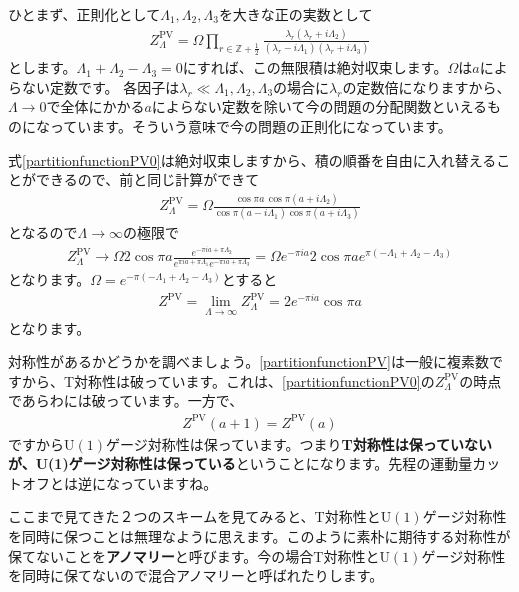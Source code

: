 \documentclass[paper=a4, fontsize=12pt, line_length=16cm, number_of_lines=33,dvipdfmx]{jlreq}
\numberwithin{equation}{section}
\newcommand{\Zb}{\mathbb{Z}}
\newcommand{\strong}[1]{\textsf{\bfseries #1}}
\newcommand{\halfint}{\Zb+\frac{1}{2}}
\newcommand{\U}{\mathrm{U}}
\newcommand{\ZPV}{Z^{\mathrm{PV}}}
\begin{document}
ひとまず、正則化として$\Lambda_1,\Lambda_2,\Lambda_3$を大きな正の実数として
\begin{align}
  \ZPV_{\Lambda}=\Omega \prod_{r\in \halfint}\frac{\lambda_r(\lambda_r+i\Lambda_2)}{(\lambda_r-i\Lambda_1)(\lambda_r+i\Lambda_3)}\label{partitionfunctionPV0}
\end{align}
とします。$\Lambda_1+\Lambda_2-\Lambda_3=0$にすれば、この無限積は絶対収束します。$\Omega$は$a$によらない定数です。
各因子は$\lambda_r\ll \Lambda_1,\Lambda_2,\Lambda_3$の場合に$\lambda_r$の定数倍になりますから、$\Lambda\to 0$で全体にかかる$a$によらない定数を除いて今の問題の分配関数といえるものになっています。そういう意味で今の問題の正則化になっています。

式\eqref{partitionfunctionPV0}は絶対収束しますから、積の順番を自由に入れ替えることができるので、前と同じ計算ができて
\begin{align}
  \ZPV_{\Lambda}=\Omega \frac{\cos\pi a\, \cos \pi(a+i\Lambda_2)}{\cos\pi(a-i\Lambda_1)\cos\pi(a+i\Lambda_3)}
\end{align}
となるので$\Lambda\to \infty$の極限で
\begin{align}
  \ZPV_{\Lambda}
  \to \Omega 2\cos \pi a\frac{e^{-\pi i a+\pi\Lambda_2}}{e^{\pi i a+\pi\Lambda_1}e^{-\pi i a+\pi\Lambda_3}}
 =\Omega e^{-\pi i a} 2 \cos\pi a  e^{\pi(-\Lambda_1+\Lambda_2-\Lambda_3)}
\end{align}
となります。$\Omega=e^{-\pi(-\Lambda_1+\Lambda_2-\Lambda_3)}$とすると
\begin{align}
  \ZPV=\lim_{\Lambda\to \infty}\ZPV_{\Lambda}=2e^{-\pi i a}\cos\pi a
\label{partitionfunctionPV}
\end{align}
となります。

対称性があるかどうかを調べましょう。\eqref{partitionfunctionPV}は一般に複素数ですから、T対称性は破っています。これは、\eqref{partitionfunctionPV0}の$\ZPV_{\Lambda}$の時点であらわには破っています。一方で、
\begin{align}
  \ZPV(a+1)=\ZPV(a)
\end{align}
ですから$\U(1)$ゲージ対称性は保っています。つまり\strong{T対称性は保っていないが、U(1)ゲージ対称性は保っている}ということになります。先程の運動量カットオフとは逆になっていますね。

ここまで見てきた２つのスキームを見てみると、T対称性と$\U(1)$ゲージ対称性を同時に保つことは無理なように思えます。このように素朴に期待する対称性が保てないことを\strong{アノマリー}と呼びます。今の場合T対称性と$\U(1)$ゲージ対称性を同時に保てないので混合アノマリーと呼ばれたりします。
\end{document}

